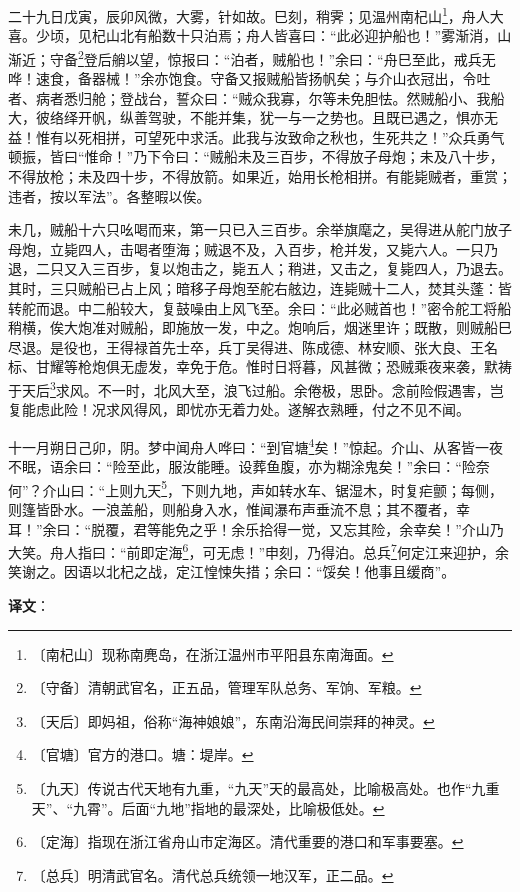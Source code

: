 \documentclass[12pt,UTF-8,openany]{ctexbook}
\begin{document}
\begin{normalsize}
    二十九日戊寅，辰卯风微，大雾，针如故。巳刻，稍霁；见温州南杞山\footnote{〔南杞山〕现称南麂岛，在浙江温州市平阳县东南海面。}，舟人大喜。少顷，见杞山北有船数十只泊焉；舟人皆喜曰：“此必迎护船也！”雾渐消，山渐近；守备\footnote{〔守备〕清朝武官名，正五品，管理军队总务、军饷、军粮。}登后艄以望，惊报曰：“泊者，贼船也！”余曰：“舟巳至此，戒兵无哗！速食，备器械！”余亦饱食。守备又报贼船皆扬帆矣；与介山衣冠出，令吐者、病者悉归舱；登战台，誓众曰：“贼众我寡，尔等未免胆怯。然贼船小、我船大，彼络绎开帆，纵善驾驶，不能并集，犹一与一之势也。且既已遇之，惧亦无益！惟有以死相拼，可望死中求活。此我与汝致命之秋也，生死共之！”众兵勇气顿振，皆曰“惟命！”乃下令曰：“贼船未及三百步，不得放子母炮；未及八十步，不得放枪；未及四十步，不得放箭。如果近，始用长枪相拼。有能毙贼者，重赏；违者，按以军法”。各整暇以俟。
    
    未几，贼船十六只吆喝而来，第一只已入三百步。余举旗麾之，吴得进从舵门放子母炮，立毙四人，击喝者堕海；贼退不及，入百步，枪并发，又毙六人。一只乃退，二只又入三百步，复以炮击之，毙五人；稍进，又击之，复毙四人，乃退去。其时，三只贼船已占上风；暗移子母炮至舵右舷边，连毙贼十二人，焚其头蓬：皆转舵而退。中二船较大，复鼓噪由上风飞至。余曰：“此必贼首也！”密令舵工将船稍横，俟大炮准对贼船，即施放一发，中之。炮响后，烟迷里许；既散，则贼船巳尽退。是役也，王得禄首先士卒，兵丁吴得进、陈成德、林安顺、张大良、王名标、甘耀等枪炮俱无虚发，幸免于危。惟时日将暮，风甚微；恐贼乘夜来袭，默祷于天后\footnote{〔天后〕即妈祖，俗称“海神娘娘”，东南沿海民间崇拜的神灵。}求风。不一时，北风大至，浪飞过船。余倦极，思卧。念前险假遇害，岂复能虑此险！况求风得风，即忧亦无着力处。遂解衣熟睡，付之不见不闻。
    
    十一月朔日己卯，阴。梦中闻舟人哗曰：“到官塘\footnote{〔官塘〕官方的港口。塘：堤岸。}矣！”惊起。介山、从客皆一夜不眠，语余曰：“险至此，服汝能睡。设葬鱼腹，亦为糊涂鬼矣！”余曰：“险奈何”？介山曰：“上则九天\footnote{〔九天〕传说古代天地有九重，“九天”天的最高处，比喻极高处。也作“九重天”、“九霄”。后面“九地”指地的最深处，比喻极低处。}，下则九地，声如转水车、锯湿木，时复疟颤；每侧，则篷皆卧水。一浪盖船，则船身入水，惟闻瀑布声垂流不息；其不覆者，幸耳！”余曰：“脱覆，君等能免之乎！余乐拾得一觉，又忘其险，余幸矣！”介山乃大笑。舟人指曰：“前即定海\footnote{〔定海〕指现在浙江省舟山市定海区。清代重要的港口和军事要塞。}，可无虑！”申刻，乃得泊。总兵\footnote{〔总兵〕明清武官名。清代总兵统领一地汉军，正二品。}何定江来迎护，余笑谢之。因语以北杞之战，定江惶悚失措；余曰：“馁矣！他事且缓商”。
\end{normalsize}


\newpage

\textbf{译文}：
\end{document}

